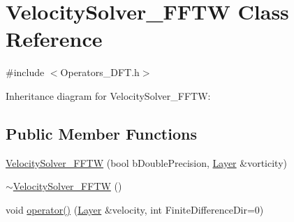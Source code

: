 \hypertarget{class_velocity_solver___f_f_t_w}{}\section{Velocity\+Solver\+\_\+\+F\+F\+T\+W Class Reference}
\label{class_velocity_solver___f_f_t_w}


{\ttfamily \#include $<$Operators\+\_\+\+D\+F\+T.\+h$>$}



Inheritance diagram for Velocity\+Solver\+\_\+\+F\+F\+T\+W\+:
\subsection*{Public Member Functions}
\begin{DoxyCompactItemize}
\item 
\hyperlink{class_velocity_solver___f_f_t_w_ae7c2966900d04a6a3cab0803ff42127f}{Velocity\+Solver\+\_\+\+F\+F\+T\+W} (bool b\+Double\+Precision, \hyperlink{struct_layer}{Layer} \&vorticity)
\item 
\hyperlink{class_velocity_solver___f_f_t_w_a6e7208c1edddd4f703a640847fe8c02a}{$\sim$\+Velocity\+Solver\+\_\+\+F\+F\+T\+W} ()
\item 
void \hyperlink{class_velocity_solver___f_f_t_w_a95cbb50d8bfc937b4d9bcd9a97b7228f}{operator()} (\hyperlink{struct_layer}{Layer} \&velocity, int Finite\+Difference\+Dir=0)
\end{DoxyCompactItemize}
